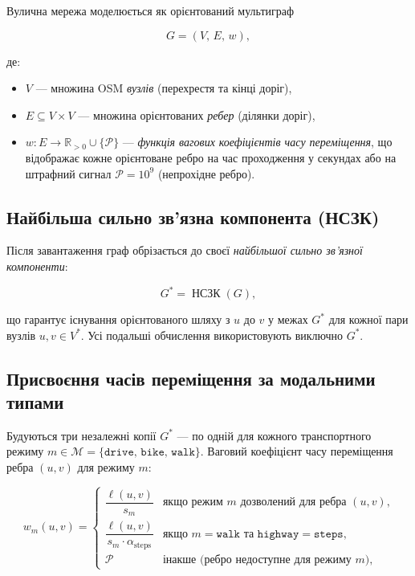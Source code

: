 \documentclass[12pt, a4paper]{article}
\theoremstyle{definition}
\begin{document}
Вулична мережа моделюється як орієнтований мультиграф

\[
  G = (V,\, E,\, w),
\]

\noindent де:
\begin{itemize}
  \item $V$ --- множина OSM \emph{вузлів} (перехрестя та кінці доріг),
  \item $E \subseteq V \times V$ --- множина орієнтованих \emph{ребер}
        (ділянки доріг),
  \item $w : E \to \mathbb{R}_{>0} \cup \{\mathcal{P}\}$ ---
        \emph{функція вагових коефіцієнтів часу переміщення}, що відображає
        кожне орієнтоване ребро на час проходження у секундах або на
        штрафний сигнал $\mathcal{P} = 10^9$ (непрохідне ребро).
\end{itemize}

\subsection{Найбільша сильно зв'язна компонента (НСЗК)}

Після завантаження граф обрізається до своєї \emph{найбільшої сильно
зв'язної компоненти}:

\[
G^* = \mathop{\text{НСЗК}}(G),
\]

\noindent що гарантує існування орієнтованого шляху з $u$ до $v$ у межах $G^*$
для кожної пари вузлів $u, v \in V^*$. Усі подальші обчислення використовують
виключно $G^*$.

\subsection{Присвоєння часів переміщення за модальними типами}
\label{sec:modal}

Будуються три незалежні копії $G^*$ --- по одній для кожного транспортного
режиму $m \in \mathcal{M} = \{\texttt{drive},\, \texttt{bike},\, \texttt{walk}\}$.
Ваговий коефіцієнт часу переміщення ребра $(u, v)$ для режиму $m$:

\begin{equation}
  \label{eq:travel_time}
  w_m(u,v) =
  \begin{cases}
    \dfrac{\ell(u,v)}{s_m}
      & \text{якщо режим $m$ дозволений для ребра $(u,v)$,} \\[8pt]
    \dfrac{\ell(u,v)}{s_m \cdot \alpha_{\text{steps}}}
      & \text{якщо } m = \texttt{walk} \text{ та } \texttt{highway} = \texttt{steps},\\[8pt]
    \mathcal{P}
      & \text{інакше (ребро недоступне для режиму $m$),}
  \end{cases}
\end{equation}
\end{document}
